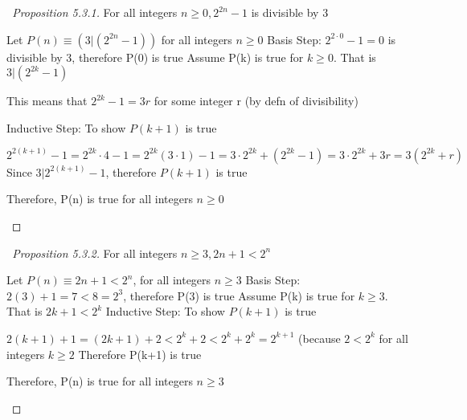 \documentclass[a4paper]{article}
\theoremstyle{definition}
\begin{document}
\begin{proof}[\proofname\ Proposition 5.3.1] For all integers $n \geq 0, 2^{2n} - 1$ is divisible by 3
  \begin{numpf}
    \pfln Let $P(n) \equiv (3 | (2^{2n} - 1))$ for all integers $n \geq 0$
    \pfln Basis Step: $2^{2 \cdot 0} - 1 = 0$ is divisible by 3, therefore P(0) is true
    \pfln Assume P(k) is true for $k \geq 0$. That is $3 | (2^{2k} - 1)$
    \begin{subpf}
      \pfln This means that $2^{2k} - 1 = 3r$ for some integer r (by defn of divisibility)
    \end{subpf}
    \pfln Inductive Step: To show $P(k+1)$ is true
    \begin{subpf}
      \pfln $2^{2(k+1)} - 1 = 2^{2k} \cdot 4 - 1 = 2^{2k}(3 \cdot 1) - 1 = 3 \cdot 2^{2k} + (2^{2k} - 1) = 3 \cdot 2^{2k} + 3r =3(2^{2k} + r)$ 
      \pfln Since $3 | 2^{2(k+1)} - 1$, therefore $P(k+1)$ is true
    \end{subpf}
      \pfln Therefore, P(n) is true for all integers $n \geq 0$
  \end{numpf}
\end{proof}

\begin{proof}[\proofname\ Proposition 5.3.2] For all integers $n \geq 3, 2n+1 < 2^n$
  \begin{numpf}
    \pfln Let $P(n) \equiv 2n+1 < 2^n$, for all integers $n \geq 3$
    \pfln Basis Step: $2(3) + 1 = 7 < 8 = 2^3$, therefore P(3) is true
    \pfln Assume P(k) is true for $k \geq 3$. That is $2k+1 < 2^k$
    \pfln Inductive Step: To show $P(k+1)$ is true
    \begin{subpf}
      \pfln $2(k+1) + 1 = (2k + 1) + 2 < 2^k + 2 < 2^k + 2^k = 2^{k+1}$ (because $2 < 2^k$ for all integers $k \geq 2$
      \pfln Therefore P(k+1) is true
    \end{subpf}
    \pfln Therefore, P(n) is true for all integers $n \geq 3$
  \end{numpf}
\end{proof}
\end{document}
